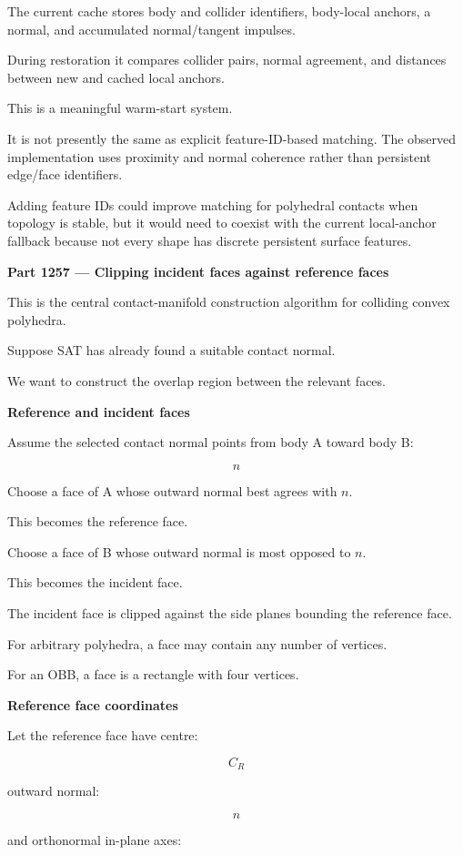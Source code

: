 The current cache stores body and collider identifiers, body-local anchors, a normal, and accumulated normal/tangent impulses.

During restoration it compares collider pairs, normal agreement, and distances between new and cached local anchors.

This is a meaningful warm-start system.

It is not presently the same as explicit feature-ID-based matching. The observed implementation uses proximity and normal coherence rather than persistent edge/face identifiers.

Adding feature IDs could improve matching for polyhedral contacts when topology is stable, but it would need to coexist with the current local-anchor fallback because not every shape has discrete persistent surface features.

\textbf{Part 1257 --- Clipping incident faces against reference faces}

This is the central contact-manifold construction algorithm for colliding convex polyhedra.

Suppose SAT has already found a suitable contact normal.

We want to construct the overlap region between the relevant faces.

\textbf{Reference and incident faces}

Assume the selected contact normal points from body A toward body B:

\[
n
\]

Choose a face of A whose outward normal best agrees with \(n\).

This becomes the reference face.

Choose a face of B whose outward normal is most opposed to \(n\).

This becomes the incident face.

The incident face is clipped against the side planes bounding the reference face.

For arbitrary polyhedra, a face may contain any number of vertices.

For an OBB, a face is a rectangle with four vertices.

\textbf{Reference face coordinates}

Let the reference face have centre:

\[
C_R
\]

outward normal:

\[
n
\]

and orthonormal in-plane axes:

